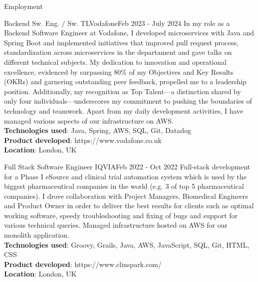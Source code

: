 \documentclass[]{mcdowellcv}
\begin{document}
  \begin{cvsection}{Employment}
		\begin{cvsubsection}{Backend Sw. Eng. / Sw. TL}{Vodafone}{Feb 2023 - July 2024}
			\hspace{\parindent} \hspace{\parindent} \hspace{\parindent} \hspace{\parindent} 
			    In my role as a Backend Software Engineer at Vodafone, I developed microservices with Java and Spring Boot and implemented initiatives that improved pull request process, standardization across microservices in the departament and gave talks on different technical subjects. My dedication to innovation and operational excellence, evidenced by surpassing 80\% of my Objectives and Key Results (OKRs) and garnering outstanding peer feedback, propelled me to a leadership position. Additionally, my recognition as Top Talent—a distinction shared by only four individuals—underscores my commitment to pushing the boundaries of technology and teamwork. Apart from my daily development activities, I have managed various aspects of our infrastructure on AWS.
			\\ \textbf{Technologies used}: Java, Spring, AWS, SQL, Git, Datadog
			\\ \textbf{Product developed}: https://www.vodafone.co.uk
			\\ \textbf{Location}: London, UK
		\end{cvsubsection}

	    \begin{cvsubsection}{Full Stack Software Engineer }{IQVIA}{Feb 2022 - Oct 2022}
			\hspace{\parindent} \hspace{\parindent} \hspace{\parindent} \hspace{\parindent} Full-stack development for a Phase I eSource and clinical trial automation system which is used by the biggest pharmaceutical companies in the world (e.g. 3 of top 5 pharmaceutical companies). I drove collaboration with Project Managers, Biomedical Engineers and Product Owner in order to deliver the best results for clients such as optimal working software, speedy troubleshooting and fixing of bugs and support for various technical queries. Managed infrastructure hosted on AWS for our monolith application.
			\\ \textbf{Technologies used}: Groovy, Grails, Java, AWS, JavaScript, SQL, Git, HTML, CSS
			\\ \textbf{Product developed}: https://www.clinspark.com/
			\\ \textbf{Location}: London, UK
		\end{cvsubsection}


\end{cvsection}
\end{document}
